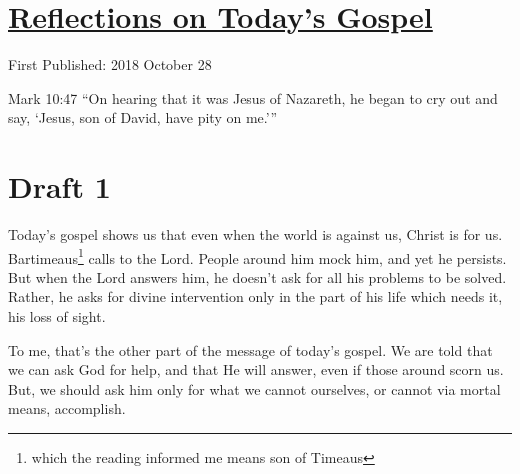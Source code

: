 \documentclass[12pt]{article}[titlepage]
\newcommand{\say}[1]{``#1''}
\newcommand{\nsay}[1]{`#1'}
\newcommand{\1}{\={a}}
\newcommand{\2}{\={e}}
\newcommand{\3}{\={\i}}
\newcommand{\4}{\=o}
\newcommand{\5}{\=u}
\newcommand{\6}{\={A}}
\renewcommand{\,}{\textsuperscript{,}}
\begin{document}
\doublespacing
\section{\href{reflections-on-readings-30-ordinary-b.html}{Reflections on Today's Gospel}}
First Published: 2018 October 28

Mark 10:47 \say{On hearing that it was Jesus of Nazareth, he began to cry out and say, \nsay{Jesus, son of David, have pity on me.}}
\section{Draft 1}
Today's gospel shows us that even when the world is against us, Christ is for us. Bartimeaus\footnote{which the reading informed me means son of Timeaus} calls to the Lord.
People around him mock him, and yet he persists.
But when the Lord answers him, he doesn't ask for all his problems to be solved. 
Rather, he asks for divine intervention only in the part of his life which needs it, his loss of sight.


To me, that's the other part of the message of today's gospel.
We are told that we can ask God for help, and that He will answer, even if those around scorn us.
But, we should ask him only for what we cannot ourselves, or cannot via mortal means, accomplish.
\end{document}
